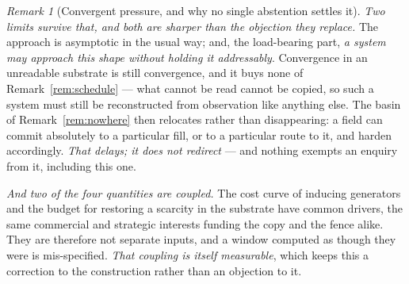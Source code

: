 \documentclass[11pt,a4paper]{article}
\theoremstyle{remark}
\newtheorem{remark}[definition]{Remark}
\begin{document}
\begin{remark}[Convergent pressure, and why no single abstention settles it]
\emph{Two limits survive that, and both are sharper than the objection they replace.} The approach is
asymptotic in the usual way; and, the load-bearing part, \emph{a system may approach this shape without
holding it addressably}. Convergence in an unreadable substrate is still convergence, and it buys none
of Remark~\ref{rem:schedule} --- what cannot be read cannot be copied, so such a system must still be
reconstructed from observation like anything else. The basin of Remark~\ref{rem:nowhere} then relocates
rather than disappearing: a field can commit absolutely to a particular fill, or to a particular route
to it, and harden accordingly. \emph{That delays; it does not redirect} --- and nothing exempts an
enquiry from it, including this one.

\emph{And two of the four quantities are coupled.} The cost curve of
inducing generators and the budget for restoring a scarcity in the substrate have common drivers, the
same commercial and strategic interests funding the copy and the fence alike. They are therefore not
separate inputs, and a window computed as though they were is mis-specified. \emph{That coupling is
itself measurable}, which keeps this a correction to the construction rather than an objection to it.
\end{remark}
\end{document}
